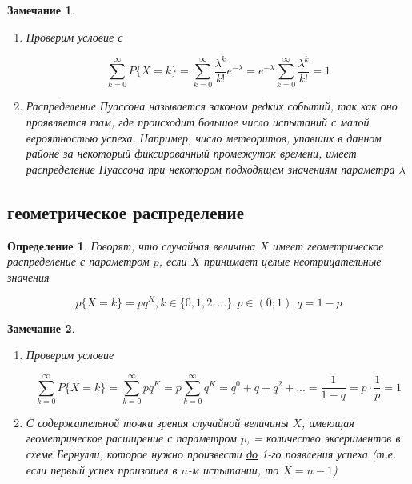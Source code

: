 \documentclass[a4paper, 14pt]{report}
\newtheorem{defenition}{Определение}[section]
\newtheorem{note}{Замечание}[section]
\begin{document}
\begin{note}
    \begin{enumerate}
        \item Проверим условие с 

            $$
            \sum_{k=0}^{\infty} P\{X = k\} = \sum_{k=0}^\infty \frac{\lambda^k}{k!} e^{-\lambda} = e^{-\lambda} \sum_{k=0}^\infty \frac{\lambda^k}{k!} = 1
            $$

        \item Распределение Пуассона называется законом редких событий, так как оно проявляется там, где происходит большое число испытаний с малой вероятностью успеха. Например, число метеоритов, упавших в данном районе за некоторый фиксированный промежуток времени, имеет распределение Пуассона при некотором подходящем значениям параметра $\lambda$
    \end{enumerate}
\end{note}


\subsection{геометрическое распределение}

\begin{defenition}
    Говорят, что случайная величина $X$ имеет геометрическое распределение с параметром $p$, если $X$ принимает целые неотрицательные значения

    $$
    p\{X=k\} = pq^K, k \in \{0,1,2, ...\}, p\in(0;1), q = 1-p
    $$
\end{defenition}

\begin{note}
    \begin{enumerate}
        \item Проверим условие

            $$
            \sum_{k=0}^\infty P\{X=k\} = \sum_{k=0}^\infty pq^K = p \sum_{k=0}^\infty q^K = q^0+q+q^2+...=\frac{1}{1-q}=p \cdot \frac{1}{p} = 1
            $$

        \item С содержательной точки зрения случайной величины $X$, имеющая геометрическое расширение с параметром $p$, = количество эксериментов в схеме Бернулли, которое нужно произвести \underline{до} 1-го появления успеха (т.е. если первый успех произошел в $n$-м испытании, то $X=n-1$)
    \end{enumerate}

\end{note}
\end{document}
